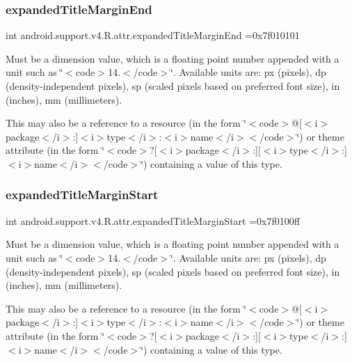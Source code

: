 \subsubsection{\texorpdfstring{expanded\+Title\+Margin\+End}{expandedTitleMarginEnd}}
{\footnotesize\ttfamily int android.\+support.\+v4.\+R.\+attr.\+expanded\+Title\+Margin\+End =0x7f010101\hspace{0.3cm}{\ttfamily [static]}}

Must be a dimension value, which is a floating point number appended with a unit such as \char`\"{}$<$code$>$14.\+5sp$<$/code$>$\char`\"{}. Available units are\+: px (pixels), dp (density-\/independent pixels), sp (scaled pixels based on preferred font size), in (inches), mm (millimeters). 

This may also be a reference to a resource (in the form \char`\"{}$<$code$>$@\mbox{[}$<$i$>$package$<$/i$>$\+:\mbox{]}$<$i$>$type$<$/i$>$\+:$<$i$>$name$<$/i$>$$<$/code$>$\char`\"{}) or theme attribute (in the form \char`\"{}$<$code$>$?\mbox{[}$<$i$>$package$<$/i$>$\+:\mbox{]}\mbox{[}$<$i$>$type$<$/i$>$\+:\mbox{]}$<$i$>$name$<$/i$>$$<$/code$>$\char`\"{}) containing a value of this type. \mbox{\label{classandroid_1_1support_1_1v4_1_1R_1_1attr_a2081b8dc1c473ecad9c64a00841c4d5c}} 
\subsubsection{\texorpdfstring{expanded\+Title\+Margin\+Start}{expandedTitleMarginStart}}
{\footnotesize\ttfamily int android.\+support.\+v4.\+R.\+attr.\+expanded\+Title\+Margin\+Start =0x7f0100ff\hspace{0.3cm}{\ttfamily [static]}}

Must be a dimension value, which is a floating point number appended with a unit such as \char`\"{}$<$code$>$14.\+5sp$<$/code$>$\char`\"{}. Available units are\+: px (pixels), dp (density-\/independent pixels), sp (scaled pixels based on preferred font size), in (inches), mm (millimeters). 

This may also be a reference to a resource (in the form \char`\"{}$<$code$>$@\mbox{[}$<$i$>$package$<$/i$>$\+:\mbox{]}$<$i$>$type$<$/i$>$\+:$<$i$>$name$<$/i$>$$<$/code$>$\char`\"{}) or theme attribute (in the form \char`\"{}$<$code$>$?\mbox{[}$<$i$>$package$<$/i$>$\+:\mbox{]}\mbox{[}$<$i$>$type$<$/i$>$\+:\mbox{]}$<$i$>$name$<$/i$>$$<$/code$>$\char`\"{}) containing a value of this type. \mbox{\label{classandroid_1_1support_1_1v4_1_1R_1_1attr_a8ff24ef763c69050c7178b685ee96561}} 
